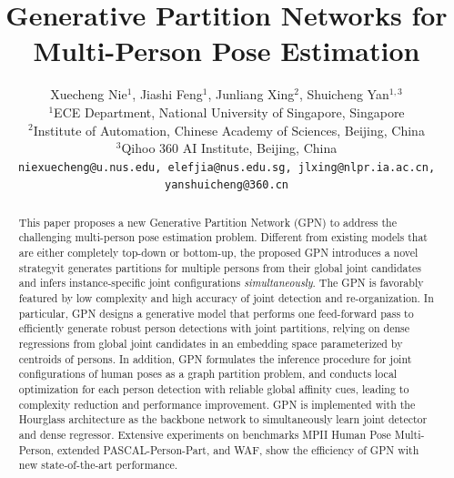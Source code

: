 \documentclass[10pt,twocolumn,letterpaper]{article}
\begin{document}
\title{Generative Partition Networks for Multi-Person Pose Estimation}

\author{
  Xuecheng Nie$^1$, Jiashi Feng$^1$, Junliang Xing$^2$, Shuicheng Yan$^{1,3}$\\
  $^1$ECE Department, National University of Singapore, Singapore\\
  $^2$Institute of Automation, Chinese Academy of Sciences, Beijing, China\\
  $^3$Qihoo 360 AI Institute, Beijing, China \\
  \footnotesize{\texttt{niexuecheng@u.nus.edu, elefjia@nus.edu.sg, jlxing@nlpr.ia.ac.cn, yanshuicheng@360.cn}} \\
}

\maketitle

\begin{abstract}
   This paper proposes a new Generative Partition Network (GPN) to address the challenging multi-person pose estimation problem. Different from existing  models that are either completely
   top-down or bottom-up, the proposed GPN introduces a novel strategy\textemdash it generates partitions for multiple persons from their global joint candidates and infers instance-specific
   joint configurations \emph{simultaneously}.
   The GPN is favorably featured by low complexity and high accuracy of joint detection and re-organization.
   In particular, GPN designs a generative model that performs one feed-forward pass to efficiently generate robust person detections with joint partitions, relying on dense regressions from
   global joint candidates in an embedding space parameterized by centroids of persons.
   In addition, GPN formulates the inference procedure for joint configurations of human poses as a graph partition problem, and conducts local optimization for each person
   detection with reliable global affinity cues, leading to complexity reduction and performance improvement. GPN is implemented with the Hourglass architecture as the backbone network to
   simultaneously learn joint detector and dense regressor.
   Extensive experiments on benchmarks MPII Human Pose Multi-Person, extended PASCAL-Person-Part, and WAF, show the efficiency of GPN with new state-of-the-art performance.
\end{abstract}

\end{document}
